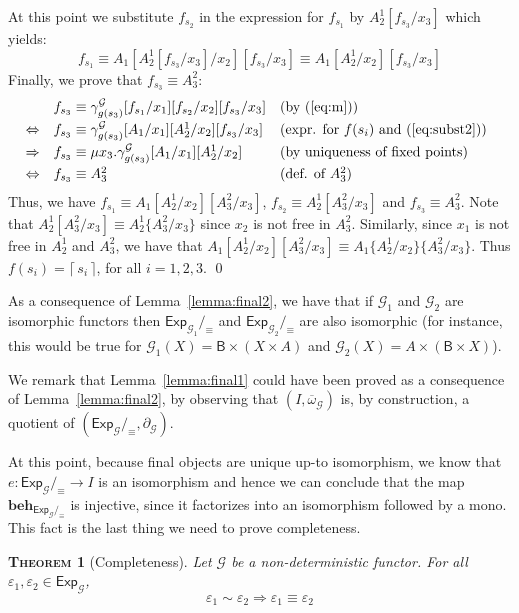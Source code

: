 \documentclass{LMCS}
\newcommand\E\varepsilon
\newcommand\Exp{\mathsf{Exp}}
\newcommand\B{\mathsf{B}}
\newcommand\G{\mathcal{G}}
\def\ceil#1{\lceil\, #1 \,\rceil}
\def\hyph{-\penalty0\hskip0pt\relax}
\theoremstyle{definition}
\theoremstyle{plain}
\theoremstyle{plain}
\newtheorem{mytheorem}[mydefinition]{\textsc{Theorem}}
\theoremstyle{plain}
\theoremstyle{plain}
\theoremstyle{definition}
\theoremstyle{definition}
\newenvironment{theorem}{
\begin{mytheorem}}
    {\end{mytheorem}}
\begin{document}
At this point we substitute $f_{s_2}$ in the expression for $f_{s_1}$ by $A_2^1[f_{s_3}/x_3]$ which yields:
\[
f_{s_1} \equiv  A_1[A^1_2 [f_{s_3}/x_3]  /x_2]  [f_{s_3}/x_3]  \equiv A_1[A^1_2/x_2]  [f_{s_3}/x_3] 
\]
Finally, we prove that $f_{s_3} \equiv A_3^2$:
\[
\begin{array}{@{}lll} 
&f_{s_3} \equiv \gamma_{g(s_3)}^\G [f_{s_1}/x_1]  [f_{s_2}/x_2]  [f_{s_3}/x_3] &\text{(by~(\ref{eq:m})})\\[.8ex]
\Leftrightarrow&f_{s_3} \equiv \gamma_{g(s_3)}^\G [A_1/x_1]  [A_2^1/x_2]  [f_{s_3}/x_3]
&\text{(expr. for $f(s_i)$ and (\ref{eq:subst2}))}\\[.8ex]
\Rightarrow& f_{s_3} \equiv \mu x_3. \gamma_{g(s_3)}^\G [A_1/x_1]  [A_2^1/x_2]  &\text{(by uniqueness of fixed points)}\\[.8ex]
\Leftrightarrow& f_{s_3} \equiv A_3^2  &\text{(def. of $A_3^2$)}
\end{array}
\]
Thus, we have $f_{s_1} \equiv A_1[A^1_2/x_2]  [A^2_3/x_3] $, $f_{s_2}
\equiv A_2^1  [A^2_3/x_3]$ and $f_{s_3} \equiv A^2_3$. Note that
$A_2^1  [A^2_3/x_3]  \equiv A_2^1  \{A^2_3/x_3\} $ since $x_2$ is not
free in $A^2_3$. Similarly, since $x_1$ is not free in $A^1_2$ and
$A^2_3$, we have that $A_1[A^1_2/x_2]  [A^2_3/x_3]  \equiv A_1\{A^1_2/x_2\}  \{A^2_3/x_3\}$. Thus $f(s_i) = \ceil{s_i}$, for all $i=1,2,3$.
\qed


As a consequence of
Lemma~\ref{lemma:final2}, we have that if $\G_1$ and $\G_2$ are
isomorphic
functors then $\Exp_{\G_1}/_\equiv$ and $\Exp_{\G_2}/_\equiv$ are
also isomorphic (for instance, this would be true for $\G_1(X) = \B
\times (X \times A)$ and
$\G_2(X) =  A \times (\B \times X)$). 

We remark that Lemma~\ref{lemma:final1} could have been proved as a
consequence of Lemma~\ref{lemma:final2}, by observing that
$(I,\overline \omega_\G)$ is, by construction, a quotient of
$(\Exp_\G/_{\equiv}, \partial_{\G})$.  

At this point, because final objects are unique up-to isomorphism, we
know that $e\colon \Exp_\G/_\equiv \to I$ is an isomorphism and hence we
can conclude that the map $\mathbf{beh}_{\Exp_\G/_{\equiv}}$ is injective, since it factorizes into
an isomorphism followed by a mono. This fact is the last
thing we need to prove completeness.

\begin{theorem}[Completeness]
Let $\G$ be a non\hyph deterministic functor. For all
$\E_1,\E_2\in \Exp_{\G}$,
\[
\E_1 \sim \E_2 \Rightarrow \E_1 \equiv \E_2
\]
\end{theorem}
\end{document}
